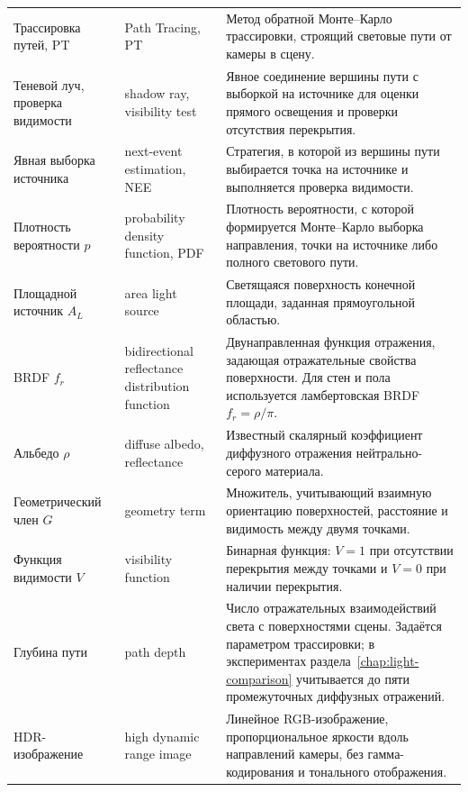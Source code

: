 {\begin{xltabular}{\textwidth}{>{\raggedright\arraybackslash}p{0.23\textwidth} >{\raggedright\arraybackslash}p{0.19\textwidth} >{\raggedright\arraybackslash}X}
Трассировка путей, PT & Path Tracing, PT & Метод обратной Монте--Карло трассировки, строящий световые пути от камеры в сцену. \\

Теневой луч, проверка видимости & shadow ray, visibility test & Явное соединение вершины пути с выборкой на источнике для оценки прямого освещения и проверки отсутствия перекрытия. \\

Явная выборка источника & next-event estimation, NEE & Стратегия, в которой из вершины пути выбирается точка на источнике и выполняется проверка видимости. \\

Плотность вероятности $p$ & probability density function, PDF & Плотность вероятности, с которой формируется Монте--Карло выборка направления, точки на источнике либо полного светового пути. \\

Площадной источник $A_L$ & area light source & Светящаяся поверхность конечной площади, заданная прямоугольной областью. \\

BRDF $f_r$ & bidirectional reflectance distribution function & Двунаправленная функция отражения, задающая отражательные свойства поверхности. Для стен и пола используется ламбертовская BRDF $f_r=\rho/\pi$. \\

Альбедо $\rho$ & diffuse albedo, reflectance & Известный скалярный коэффициент диффузного отражения нейтрально-серого материала. \\

Геометрический член $G$ & geometry term & Множитель, учитывающий взаимную ориентацию поверхностей, расстояние и видимость между двумя точками. \\

Функция видимости $V$ & visibility function & Бинарная функция: $V=1$ при отсутствии перекрытия между точками и $V=0$ при наличии перекрытия. \\

Глубина пути & path depth & Число отражательных взаимодействий света с поверхностями сцены. Задаётся параметром трассировки; в экспериментах раздела~\ref{chap:light-comparison} учитывается до пяти промежуточных диффузных отражений. \\

HDR-изображение & high dynamic range image & Линейное RGB-изображение, пропорциональное яркости вдоль направлений камеры, без гамма-кодирования и тонального отображения. \\


\end{xltabular}}
